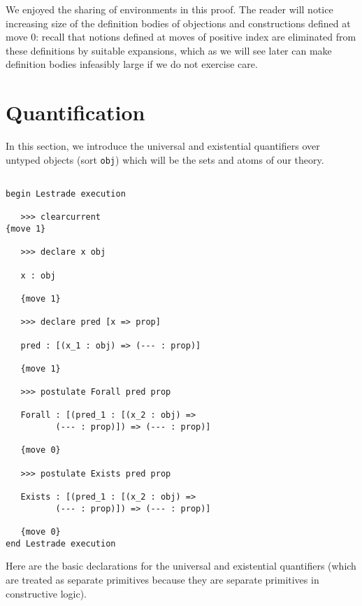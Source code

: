 \documentclass[12pt]{article}
\begin{document}
We enjoyed the sharing of environments in this proof.  The reader will notice increasing size of the definition bodies of objections and constructions defined at move 0:  recall that notions defined at moves of positive index are eliminated from these definitions by suitable expansions, which as we will see later can make definition bodies infeasibly large if we do not exercise care.


\section{Quantification}

In this section, we introduce the universal and existential quantifiers over untyped objects (sort {\tt obj}) which will be the sets and atoms of our theory.

\begin{verbatim}

begin Lestrade execution

   >>> clearcurrent
{move 1}

   >>> declare x obj

   x : obj

   {move 1}

   >>> declare pred [x => prop]

   pred : [(x_1 : obj) => (--- : prop)]

   {move 1}

   >>> postulate Forall pred prop

   Forall : [(pred_1 : [(x_2 : obj) => 
          (--- : prop)]) => (--- : prop)]

   {move 0}

   >>> postulate Exists pred prop

   Exists : [(pred_1 : [(x_2 : obj) => 
          (--- : prop)]) => (--- : prop)]

   {move 0}
end Lestrade execution
\end{verbatim}

Here are the basic declarations for the universal and existential quantifiers (which are treated as separate primitives because they are separate
primitives in constructive logic).  
\end{document}

